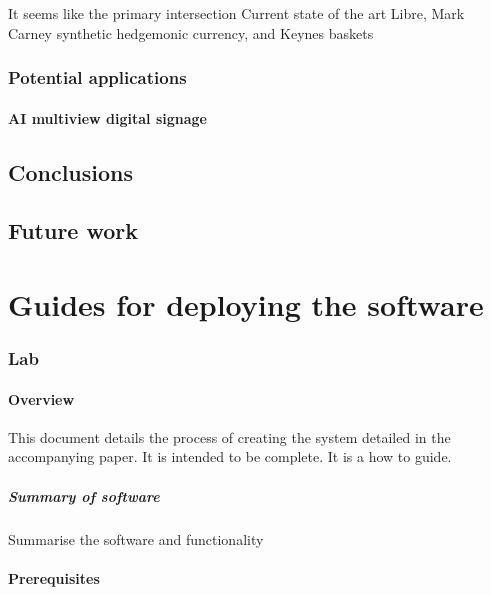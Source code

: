 \documentclass[
	11pt, %
	fleqn, %
	a4paper, %
]{LegrandOrangeBook}
\begin{document}
It seems like the primary intersection 
Current state of the art 
Libre, Mark Carney synthetic hedgemonic currency, and Keynes baskets

\section{Potential applications }
\lipsum[50]
\subsection{AI multiview digital signage}
\lipsum[50]
\chapter{Conclusions }
\lipsum[50]
\chapter{Future work}
\lipsum[50]
\lipsum[50]


\part{Guides for deploying the software}

\hypertarget{lab}{%
\section{Lab}\label{lab}}

\hypertarget{overview}{%
\subsection{Overview}\label{overview}}

This document details the process of creating the system detailed in the
accompanying paper. It is intended to be complete. It is a how to guide.

\hypertarget{summary-of-software}{%
\subsubsection{Summary of software}\label{summary-of-software}}

Summarise the software and functionality

\hypertarget{prerequisites}{%
\subsection{Prerequisites}\label{prerequisites}}
\end{document}
